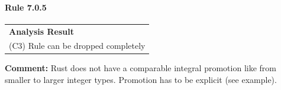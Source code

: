 \paragraph{Rule 7.0.5}
\begin{longtable}{p{13cm}}
\textbf{Analysis Result} \\
(C3) Rule can be dropped completely \\
\end{longtable}
\textbf{Comment:} Rust does not have a comparable integral promotion like \Cpp from smaller to larger integer types. Promotion has to be explicit (see example). \\


